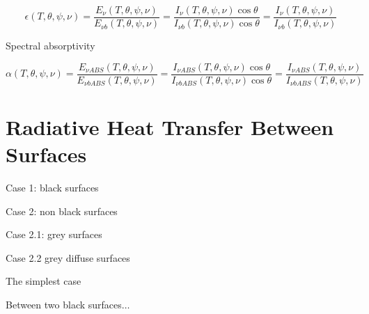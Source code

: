 \documentclass[12pt]{article}
\renewcommand{\_}{\kern-1.5pt\textunderscore\kern-1.5pt}
\begin{document}
 \[  \epsilon  \left( T, \theta , \psi , \nu  \right) =\frac{E_{ \nu } \left( T, \theta , \psi , \nu  \right) }{E_{ \nu b} \left( T, \theta , \psi , \nu  \right) }=\frac{I_{ \nu } \left( T, \theta , \psi , \nu  \right) \cos  \theta }{I_{ \nu b} \left( T, \theta , \psi , \nu  \right) \cos  \theta }=\frac{I_{ \nu } \left( T, \theta , \psi , \nu  \right) }{I_{ \nu b} \left( T, \theta , \psi , \nu  \right) } \] \par

Spectral absorptivity\par

 \[  \alpha  \left( T, \theta , \psi , \nu  \right) =\frac{E_{ \nu ABS} \left( T, \theta , \psi , \nu  \right) }{E_{ \nu bABS} \left( T, \theta , \psi , \nu  \right) }=\frac{I_{ \nu ABS} \left( T, \theta , \psi , \nu  \right) \cos  \theta }{I_{ \nu bABS} \left( T, \theta , \psi , \nu  \right) \cos  \theta }=\frac{I_{ \nu ABS} \left( T, \theta , \psi , \nu  \right) }{I_{ \nu bABS } \left( T, \theta , \psi , \nu  \right) } \] \par


\vspace{\baselineskip}

\vspace{\baselineskip}
\section*{Radiative Heat Transfer Between Surfaces}
Case 1: black surfaces\par

\par

Case 2: non black surfaces\par

\par

Case 2.1: grey surfaces\par

\par

Case 2.2 grey diffuse surfaces\par

\par

The simplest case\par

Between two black surfaces$ \ldots $ \par

\par
\end{document}
